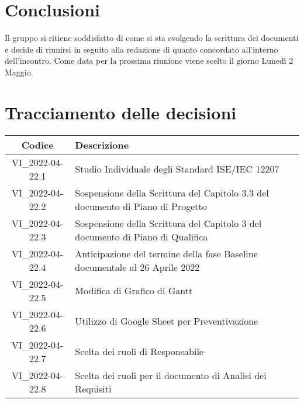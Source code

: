 \section{Conclusioni}
	Il gruppo si ritiene soddisfatto di come si sta svolgendo la scrittura dei documenti e decide di riunirsi in seguito alla redazione di quanto concordato all'interno dell'incontro. Come data per la prossima riunione viene scelto il giorno Lunedì 2 Maggio.
\newpage

\section*{Tracciamento delle decisioni}
	\renewcommand{\arraystretch}{1.8} %
	\begin{tabular}{ |c|l| }
		\hline
		\textbf{Codice} & \textbf{Descrizione} \\
		\hline
		VI\_2022-04-22.1 & Studio Individuale degli Standard ISE/IEC 12207\\ 
		\hline
		VI\_2022-04-22.2 & Sospensione della Scrittura del Capitolo 3.3 del documento di Piano di Progetto \\ 
		\hline
		VI\_2022-04-22.3 & Sospensione della Scrittura del Capitolo 3 del documento di Piano di Qualifica \\ 
		\hline
		VI\_2022-04-22.4 & Anticipazione del termine della fase Baseline documentale al 26 Aprile 2022 \\ 
		\hline
		VI\_2022-04-22.5 & Modifica di Grafico di Gantt\\ 
		\hline
		VI\_2022-04-22.6 & Utilizzo di Google Sheet per Preventivazione\\ 
		\hline
		VI\_2022-04-22.7 & Scelta dei ruoli di Responsabile\\ 
		\hline
		VI\_2022-04-22.8 & Scelta dei ruoli per il documento di Analisi dei Requisiti\\ 
		\hline
	\end{tabular}